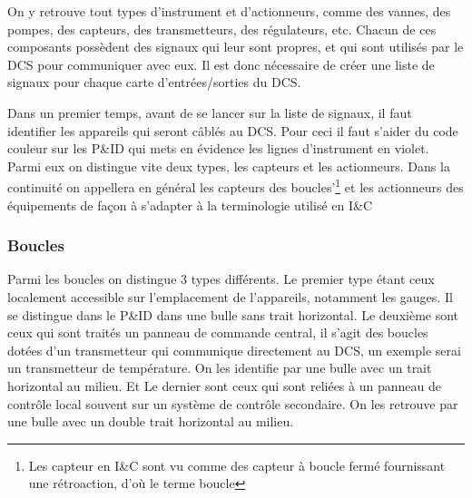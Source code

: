\documentclass[11pt, openright]{book}
\begin{document}
On y retrouve tout types d'instrument et d'actionneurs, comme des vannes, des pompes, des capteurs, des transmetteurs, des régulateurs, etc. Chacun de ces composants possèdent des signaux qui leur sont propres, et qui sont utilisés par le DCS pour communiquer avec eux. Il est donc nécessaire de créer une liste de signaux pour chaque carte d'entrées/sorties du DCS.

Dans un premier temps, avant de se lancer sur la liste de signaux, il faut identifier les appareils qui seront câblés au DCS. Pour ceci il faut s'aider du code couleur sur les P\&ID qui mets en évidence les lignes d'instrument en violet. Parmi eux on distingue vite deux types, les capteurs et les actionneurs. Dans la continuité on appellera en général les capteurs des boucles'\footnote{Les capteur en I\&C sont vu comme des capteur à boucle fermé fournissant une rétroaction, d'où le terme boucle} et les actionneurs des équipements de façon à s'adapter à la terminologie utilisé en I\&C


\subsubsection{Boucles}

Parmi les boucles on distingue 3 types différents. Le premier type étant ceux localement accessible sur l'emplacement de l'appareils, notamment les gauges. Il se distingue dans le P\&ID dans une bulle sans trait horizontal. Le deuxième sont ceux qui sont traités un panneau de commande central, il s'agit des boucles dotées d'un transmetteur qui communique directement au DCS, un exemple serai un transmetteur de température. On les identifie par une bulle avec un trait horizontal au milieu. Et Le dernier sont ceux qui sont reliées à un panneau de contrôle local souvent sur un système de contrôle secondaire. On les retrouve par une bulle avec un double trait horizontal au milieu.
\end{document}
